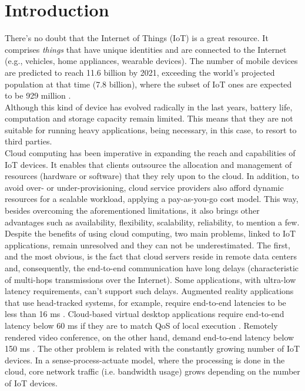 \section{Introduction}\label{sec:Introduction}
\noindent
There’s no doubt that the Internet of Things (IoT) is a great resource. It comprises \textit{things} that have unique identities and are connected to the Internet (e.g., vehicles, home appliances, wearable devices). The number of mobile devices are predicted to reach 11.6 billion by 2021, exceeding the world’s projected population at that time (7.8 billion), where the subset of IoT ones are expected to be 929 million \cite{cisco_2017}.\\
\noindent\tab Although this kind of device has evolved radically in the last years, battery life, computation and storage capacity remain limited. This means that they are not suitable for running heavy applications, being necessary, in this case, to resort to third parties.\\
\noindent\tab Cloud computing has been imperative in expanding the reach and capabilities of IoT devices. It enables that clients outsource the allocation and management of resources (hardware or software) that they rely upon to the cloud. In addition, to avoid over- or under-provisioning, cloud service providers also afford dynamic resources for a scalable workload, applying a pay-as-you-go cost model. This way, besides overcoming the aforementioned limitations, it also brings other advantages such as availability, flexibility, scalability, reliability, to mention a few.\\
\noindent\tab Despite the benefits of using cloud computing, two main problems, linked to IoT applications, remain unresolved and they can not be underestimated. The first, and the most obvious, is the fact that cloud servers reside in remote data centers and, consequently, the end-to-end communication have long delays (characteristic of multi-hops transmissions over the Internet). Some applications, with ultra-low latency requirements, can't support such delays.  Augmented reality applications that use head-tracked systems, for example, require end-to-end latencies to be less than 16 ms \cite{ellis2004generalizeability}. Cloud-based virtual desktop applications require end-to-end latency below 60 ms if they are to match QoS of local execution \cite{taylor2015virtual}. Remotely rendered video conference, on the other hand, demand end-to-end latency below 150 ms \cite{szigeti2005end}. The other problem is related with the constantly growing number of IoT devices. In a sense-process-actuate model, where the processing is done in the cloud, core network traffic (i.e. bandwidth usage) grows depending on the number of IoT devices.\\
